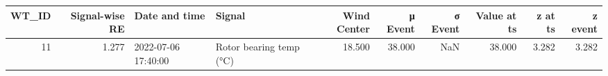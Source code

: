 \begin{tabular}{rrllrrrrrr}
\toprule
WT\_ID & Signal-wise RE & Date and time & Signal & Wind Center & μ Event & σ Event & Value at ts & z at ts & z event \\
\midrule
11 & 1.277 & 2022-07-06 17:40:00 & Rotor bearing temp (°C) & 18.500 & 38.000 & NaN & 38.000 & 3.282 & 3.282 \\
\bottomrule
\end{tabular}
